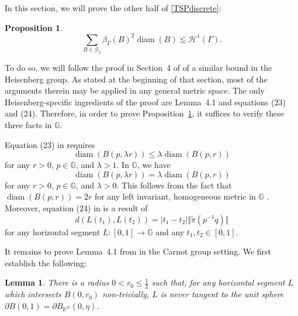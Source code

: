 \documentclass[11pt]{amsart}
\newtheorem{lemma}[theorem]{Lemma}
\newtheorem{proposition}[theorem]{Proposition}
\def\diam{{\rm diam\,}}
\theoremstyle{definition}
\def\diam{\operatorname{diam}}
\numberwithin{theorem}{section} \numberwithin{equation}{section}
\begin{document}
In this section, we will prove the other half of \eqref{TSPdiscrete}:
\begin{proposition}
\label{TSPdiscreteFlat}
$$
\sum_{B \in \mathcal{G}_2} \beta_{\Gamma}(B)^2 \diam (B) \lesssim \mathcal{H}^1(\Gamma).
$$
\end{proposition}
To do so, we will follow the proof in Section~4 of \cite{LiSchul}
of a similar bound in the Heisenberg group.
As stated at the beginning of that section,
most of the arguments therein may be applied in any general metric space.
The only Heisenberg-specific ingredients of the proof are Lemma~4.1 and equations (23) and (24).
Therefore, in order to prove Proposition~\ref{TSPdiscreteFlat},
it suffices to verify these three facts in $\mathbb{G}$.

Equation (23) in \cite{LiSchul} requires 
$$
\diam(B(p,\lambda r)) \leq \lambda \diam (B(p,r))
$$
for any $r>0$, $p \in \mathbb{G}$, and $\lambda > 1$.
In $\mathbb{G}$, we have
\begin{equation}
\label{23}
\diam(B(p,\lambda r)) = \lambda \diam (B(p,r))
\end{equation}
for any $r>0$, $p \in \mathbb{G}$, and $\lambda > 0$.
This follows from the fact that $\diam(B(p,r)) = 2 r$
for any left invariant, homogeneous metric in $\mathbb{G}$
\cite[Proposition 2.4]{FraSerSerOnthe}.
Moreover, equation (24) in \cite{LiSchul} is a result
of %
\begin{equation}
\label{24}
d(L(t_1),L(t_2)) = |t_1-t_2| \Vert \tilde{\pi}(p^{-1}q) \Vert
\end{equation}
for any horizontal segment $L:[0,1] \to \mathbb{G}$ and any $t_1,t_2 \in [0,1]$.

It remains to prove Lemma~4.1 from \cite{LiSchul}
in the Carnot group setting.
We first establish the following:

\begin{lemma}
\label{tangent}
There is a radius $0< r_0 \leq \tfrac12$ such that,
for any horizontal segment $L$ which intersects $B(0,r_0)$ non-trivially,
$L$ is never tangent to the unit sphere $\partial B(0,1) = \partial B_{\mathbb{R}^N}(0,\eta)$.
\end{lemma}
\end{document}
